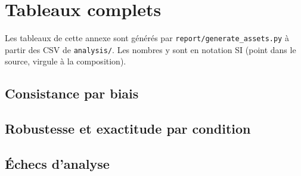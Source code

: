 \chapter{Tableaux complets}
\label{chap-full-tables}

Les tableaux de cette annexe sont générés par \texttt{report/generate\_assets.py} à partir des CSV de \texttt{analysis/}. Les nombres y sont en notation SI (point dans le source, virgule à la composition).

\section{Consistance par biais}



\section{Robustesse et exactitude par condition}



\section{Échecs d'analyse}


